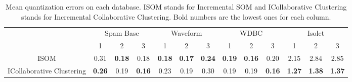 	\begin{table}[!h]
		\caption{Mean quantization errors on each database. ISOM stands for Incremental SOM and ICollaborative Clustering stands for Incremental Collaborative Clustering. Bold numbers are the lowest ones for each column.}
		\begin{center}
			\begin{tabular}{cc@{\quad}c@{\quad}cc@{\quad}c@{\quad}cc@{\quad}c@{\quad}cc@{\quad}c@{\quad}c}
				\cline{2-13}
				& \multicolumn{3}{c||}{Spam Base} & \multicolumn{3}{c||}{Waveform} & \multicolumn{3}{c||}{WDBC} & \multicolumn{3}{c|}{Isolet}\\
				\cline{2-13}
				& 1 & 2 & 3 & 1 & 2 & 3 & 1 & 2 & 3 & 1 & 2 & 3\\
				\midrule
				\multicolumn{1}{|c|}{ISOM} & 0.31 & \textbf{0.18} & 0.18 & \textbf{0.18} & \textbf{0.17} & \textbf{0.24} & \textbf{0.19} & \textbf{0.16} & 0.20 & 2.15 & 2.84 & 2.85\\
				\multicolumn{1}{|c|}{ICollaborative Clustering} & \textbf{0.26} & 0.19 & \textbf{0.16} & 0.23 & 0.19 & 0.30 & 0.19 & 0.19 & \textbf{0.16} & \textbf{1.27} & \textbf{1.38} & \textbf{1.37}\\
				\midrule
			\end{tabular}
		\end{center}
\label{tab:tab1}
	\end{table}
	

